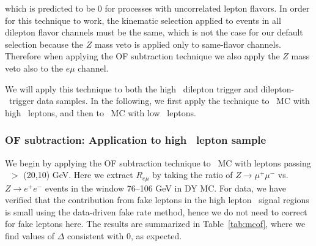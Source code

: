 which is predicted to be 0 for processes with uncorrelated lepton flavors. 
In order
for this technique to work, the kinematic selection applied to events in all dilepton
flavor channels must be the same, which is not the case for our default selection because the
$Z$ mass veto is applied only to same-flavor channels. Therefore when applying the OF
subtraction technique we also apply the $Z$ mass veto also to the $e\mu$ channel. 

We will apply this technique to both the high \pt\ dilepton trigger and dilepton-\Ht\ trigger data samples.
In the following, we first apply the technique to \ttbar\ MC with high \pt\ leptons, and then
to \ttbar\ MC with low \pt\ leptons.

\subsubsection{OF subtraction: Application to high \pt\ lepton sample}

We begin by applying the OF subtraction technique to \ttbar\ MC with leptons passing \pt\ $>$ (20,10) GeV.
Here we extract $R_{e\mu}$ by taking the ratio of $Z \to \mu^+\mu^-$ vs. $Z \to e^+e^-$ events in the
window 76--106 GeV in DY MC. 
For data, we have verified that the contribution from fake leptons in the high lepton \pt\
signal regions is small using the data-driven fake rate method, hence we do not need to 
correct for fake leptons here. 
The results are summarized in Table~\ref{tab:mcof}, where we find
values of $\Delta$ consistent with 0, as expected.

